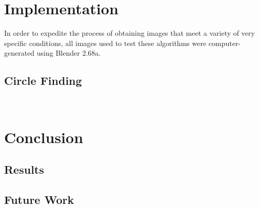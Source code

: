 \documentclass{article}
\begin{document}

\section{Implementation}
In order to expedite the process of obtaining images that meet a variety of very specific conditions, all images used to test these algorithms were computer-generated using Blender 2.68a.

\subsection{Circle Finding}

\


\section{Conclusion}
\subsection{Results}
\subsection{Future Work}

\clearpage

\appendix
%


\end{document}
